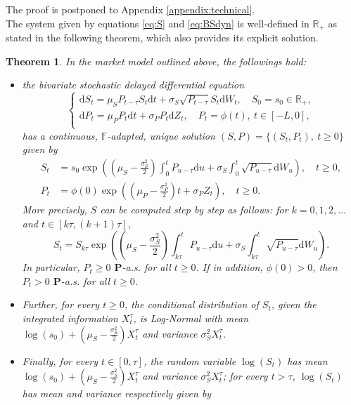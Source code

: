 \documentclass[12pt,centertags,reqno]{amsart}
\numberwithin{equation}{section} \makeatletter
\newtheorem{theorem}{Theorem}[section]
\def \P {\mathbf P}
\def \R {\mathbb R}
\def \bF {\mathbb F}
\newcommand{\ud}{\mathrm d}
\begin{document}
The proof is postponed to Appendix \ref{appendix:technical}.\\
The system given by equations \eqref{eq:S} and \eqref{eq:BSdyn}
is well-defined in $\R_+$ as stated in the following theorem, which also provides its explicit solution.
\begin{theorem} \label{th:sol}
In the market model outlined above, the followings hold:
\begin{itemize}
\item[(i)] the bivariate stochastic delayed differential equation 
\begin{equation}\label{eq:Bivdyn}
\left\{
\begin{array}{ll}
\ud S_t = \mu_S P_{t-\tau} S_t \ud t+\sigma_S \sqrt{P_{t-\tau}}S_t\ud W_t, \quad  S_0=s_0 \in \R_+,  \\
\ud P_t =\mu_P P_t\ud t+\sigma_P P_t\ud Z_t, \quad P_t = \phi(t),\ t \in [-L,0], \\%
\end{array}
\right.
\end{equation}
has a continuous, $\bF$-adapted, unique solution $(S,P)=\{(S_t,P_t),\ t \geq 0\}$ given by
\begin{align}
S_t & =s_0\exp\left(\left(\mu_{S}-\frac{\sigma_{S}^{2}}{2}\right)\int_0^t P_{u-\tau} \ud u+\sigma_S \int_0^t \sqrt{P_{u-\tau}}\ud W_u\right),\quad t \ge 0,\label{eq:sol_S}\\
P_t & = \phi(0)\exp\left(\left(\mu_{P}-\frac{\sigma_{P}^{2}}{2}\right)t+\sigma_P Z_t\right), \quad t \ge 0. \label{eq:sol_P}
\end{align}
More precisely, $S$ can be computed step by step as follows: for $k=0,1,2,\ldots$ and $t \in [k\tau,(k+1)\tau]$,
\begin{equation} \label{eq:sol_S1} 
S_t  = S_{k\tau}\exp\left(\left(\mu_{S}-\frac{\sigma_{S}^{2}}{2}\right)\int_{k\tau}^t P_{u-\tau} \ud u+\sigma_S \int_ {k\tau}^t \sqrt{P_{u-\tau}}\ud W_u\right). 
\end{equation}
In particular, %
$P_t \ge 0$ $\P$-a.s. for all $t \geq 0$. If in addition, $\phi(0) > 0$, then $P_t > 0$ $\P$-a.s. for all $t \geq 0$.
\item [(ii)] Further, for every $t \ge 0$, the conditional distribution of $S_{t}$, given the integrated information $X_t^\tau$,
is Log-Normal with mean $\log \left(s_0\right) + \left(\mu_{S}-\frac{\sigma_{S}^{2}}{2}\right)X_t^\tau$ and variance $\sigma_{S}^{2}X_t^\tau$.
\item [(iii)] Finally, for every $t \in [0,\tau]$, the random variable $\log \left( S_t \right)$ has mean $\log \left(s_0\right) + \left(\mu_{S}-\frac{\sigma_{S}^{2}}{2}\right)X_t^\tau$ and variance $\sigma_{S}^{2}X_t^\tau$; for every $t > \tau$,  $\log \left(S_t\right)$ has mean and variance respectively given by

\end{itemize}
\end{theorem}
\end{document}
